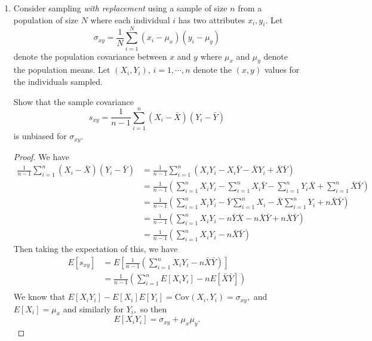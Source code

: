 \documentclass{article}
\newcommand{\cov}{\mathrm{Cov}}
\begin{document}
\begin{enumerate}
\begin{enumerate}[(a)]
		\end{enumerate}

		\newpage
	\item Consider sampling \textit{with replacement} using a sample of size $n$ from a population of size $N$ where each individual $i$ has two attributes $x_i, y_i.$ Let \[\sigma_{xy}=\frac{1}{N}\sum_{i=1}^N (x_i-\mu_x)(y_i-\mu_y)\] denote the population covariance between $x$ and $y$ where $\mu_x$ and $\mu_y$ denote the population means. Let $(X_i, Y_i), \, i=1, \cdots, n$ denote the $(x, y)$ values for the individuals sampled. 

		Show that the sample covariance \[s_{xy}=\frac{1}{n-1}\sum_{i=1}^n (X_i-\bar{X})(Y_i-\bar{Y})\] is unbiased for $\sigma_{xy}.$
		\begin{proof}
			We have
			\begin{align*}
				\frac{1}{n-1}\sum_{i=1}^{n} (X_i-\bar{X})(Y_i-\bar{Y}) &= \frac{1}{n-1}\sum_{i=1}^{n} (X_iY_i-X_i\bar{Y}-\bar{X}Y_i+\bar{X}\bar{Y}) \\
				&= \frac{1}{n-1}\left(\sum_{i=1}^{n} X_iY_i - \sum_{i=1}^{n} X_i \bar{Y} - \sum_{i=1}^{n} Y_i\bar{X} + \sum_{i=1}^{n} \bar{X}\bar{Y} \right) \\
				&= \frac{1}{n-1}\left( \sum_{i=1}^{n} X_iY_i - \bar{Y}\sum_{i=1}^{n} X_i - \bar{X}\sum_{i=1}^{n} Y_i + n\bar{X}\bar{Y} \right) \\
				&= \frac{1}{n-1}\left( \sum_{i=1}^{n} X_iY_i - n\bar{Y}\bar{X}-n\bar{X}\bar{Y}+n\bar{X}\bar{Y} \right) \\
				&= \frac{1}{n-1}\left( \sum_{i=1}^{n} X_iY_i - n\bar{X}\bar{Y} \right)
			\end{align*} 
			Then taking the expectation of this, we have 
			\begin{align*}
				E[s_{xy}] &= E\left[ \frac{1}{n-1}\left( \sum_{i=1}^{n} X_iY_i - n\bar{X}\bar{Y} \right) \right] \\
				&= \frac{1}{n-1} \left(\sum_{i=1}^{n} E[X_iY_i]-nE[\bar{X}\bar{Y}]\right) \\
			\end{align*}
			We know that $E[X_iY_i]-E[X_i]E[Y_i]=\cov(X_i, Y_i)=\sigma_{xy},$ and $E[X_i]=\mu_x$ and similarly for $Y_i,$ so then \[E[X_iY_i]=\sigma_{xy}+\mu_x\mu_y.\] 


\end{proof}
\end{enumerate}
\end{document}

